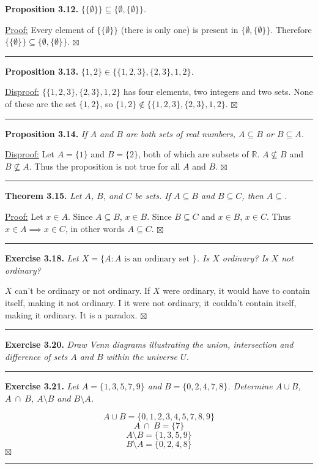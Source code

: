 \documentclass[a4paper,12pt]{article}
\newcommand{\entry}[3]
{
   \noindent\textbf{#1.}
   \emph{#2}
   \bigskip

   \noindent#3
   \bigskip
   \hrule
   \vspace{24pt}
}
\newcommand{\reals}{\mathbb{R}}
\newcommand{\sig}{$\boxtimes$}
\begin{document}
\entry{Proposition 3.12}
{$\{ \{ \emptyset \} \} \subseteq \{ \emptyset, \{ \emptyset \} \}$.}
{
\underline{Proof:} Every element of $\{ \{ \emptyset \} \}$ (there is only one) is present in $\{ \emptyset, \{ \emptyset \} \}$. Therefore $\{ \{ \emptyset \} \} \subseteq \{ \emptyset, \{ \emptyset \} \}$. \sig
}



\entry{Proposition 3.13}
{$\{ 1, 2 \} \in \{ \{ 1, 2, 3 \}, \{ 2, 3 \}, 1, 2 \}$.}
{
\underline{Disproof:} $\{ \{ 1, 2, 3 \}, \{ 2, 3 \}, 1, 2 \}$ has four elements, two integers and two sets. None of these are the set $\{ 1, 2 \}$, so $\{ 1, 2 \} \not\in \{ \{ 1, 2, 3 \}, \{ 2, 3 \}, 1, 2 \}$. \sig
}



\entry{Proposition 3.14}
{If $A$ and $B$ are both sets of real numbers, $A \subseteq B$ or $B \subseteq A$.}
{
\underline{Disproof:} Let $A = \{ 1 \}$ and $B = \{ 2 \}$, both of which are subsets of $\reals$. $A \not\subseteq B$ and $B \not\subseteq A$. Thus the proposition is not true for all $A$ and $B$. \sig
}



\entry{Theorem 3.15}
{Let $A$, $B$, and $C$ be sets. If $A \subseteq B$ and $B \subseteq C$, then $A \subseteq$.}
{
\underline{Proof:} Let $x \in A$. Since $A \subseteq B$, $x \in B$. Since $B \subseteq C$ and $x \in B$, $x\in C$. Thus $x \in A \implies x \in C$, in other words $A \subseteq C$. \sig
}



\entry{Exercise 3.18}
{
Let $X = \{A : A \mbox{ is an ordinary set } \}$. Is $X$ ordinary? Is $X$ not ordinary?
}
{
$X$ can't be ordinary or not ordinary. If $X$ were ordinary, it would have to contain itself, making it not ordinary. I it were not ordinary, it couldn't contain itself, making it ordinary. It is a paradox. \sig
}



\entry{Exercise 3.20}
{Draw Venn diagrams illustrating the union, intersection and difference of sets $A$ and $B$ within the universe $U$.}
{
\pagebreak
}



\entry{Exercise 3.21}
{
Let $A = \{ 1, 3, 5, 7, 9 \}$ and $B = \{ 0, 2, 4, 7, 8 \}$. Determine $A \cup B$, $A~\cap~B$, $A \setminus B$ and $B \setminus A$.
}
{
\[ A \cup B = \{ 0, 1, 2, 3, 4, 5, 7, 8, 9 \} \]
\[ A~\cap~B = \{ 7 \} \]
\[ A \setminus B = \{ 1, 3, 5, 9 \} \]
\[ B \setminus A = \{ 0, 2, 4, 8 \} \]
\sig
}
\end{document}
